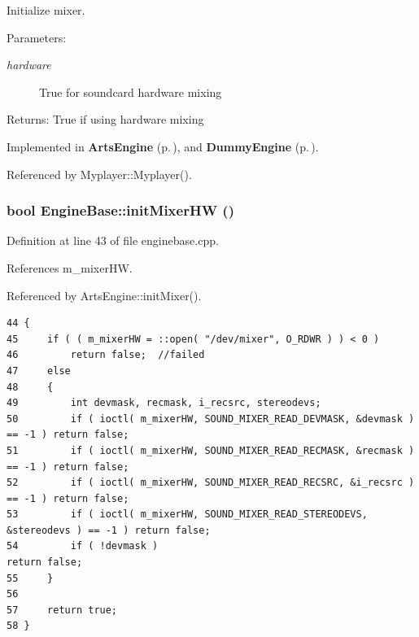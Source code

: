 Initialize mixer. \begin{Desc}
\item[Parameters:]
\begin{description}
\item[{\em hardware}]True for soundcard hardware mixing \end{description}
\end{Desc}
\begin{Desc}
\item[Returns:]True if using hardware mixing \end{Desc}


Implemented in {\bf Arts\-Engine} {\rm (p.\,\pageref{classArtsEngine_ArtsEnginea3})}, and {\bf Dummy\-Engine} {\rm (p.\,\pageref{classDummyEngine_DummyEngined1})}.

Referenced by Myplayer::Myplayer().
\subsubsection{\setlength{\rightskip}{0pt plus 5cm}bool Engine\-Base::init\-Mixer\-HW ()\hspace{0.3cm}{\tt  [protected]}}\label{classEngineBase_EngineBaseb1}




Definition at line 43 of file enginebase.cpp.

References m\_\-mixer\-HW.

Referenced by Arts\-Engine::init\-Mixer().



\footnotesize\begin{verbatim}44 {
45     if ( ( m_mixerHW = ::open( "/dev/mixer", O_RDWR ) ) < 0 )
46         return false;  //failed
47     else
48     {
49         int devmask, recmask, i_recsrc, stereodevs;
50         if ( ioctl( m_mixerHW, SOUND_MIXER_READ_DEVMASK, &devmask )       == -1 ) return false;
51         if ( ioctl( m_mixerHW, SOUND_MIXER_READ_RECMASK, &recmask )       == -1 ) return false;
52         if ( ioctl( m_mixerHW, SOUND_MIXER_READ_RECSRC, &i_recsrc )       == -1 ) return false;
53         if ( ioctl( m_mixerHW, SOUND_MIXER_READ_STEREODEVS, &stereodevs ) == -1 ) return false;
54         if ( !devmask )                                                           return false;
55     }
56 
57     return true;
58 }
\end{verbatim}\normalsize 
{}
